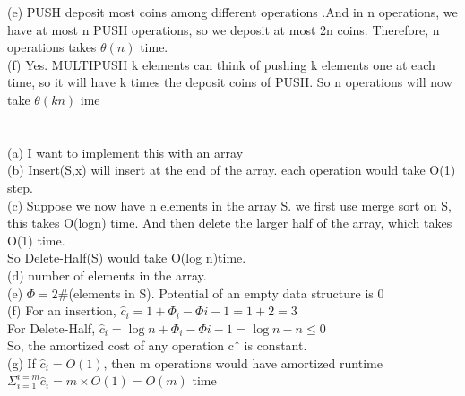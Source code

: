 \documentclass[12pt]{article}
\begin{document}
(e) PUSH deposit most coins among different operations .And in n operations, we have at most n PUSH operations, so we deposit at most 2n coins. Therefore, n operations takes $\theta(n)$ time.\\

(f) Yes. MULTIPUSH k elements can think of pushing k elements one at each time, so it will have k times the deposit coins of PUSH. So n operations will now take $\theta(kn)$ ime

\pagebreak
\section{}
(a) I want to implement this with an array\\

(b) Insert(S,x) will insert at the end of the array. each operation would take O(1) step.\\

(c) Suppose we now have n elements in the array S. we first use merge sort on S, this takes O(logn) time. And then delete the larger half of the array, which takes O(1) time.\\
So Delete-Half(S) would take O(log n)time.\\

(d) number of elements in the array.\\

(e) $\Phi = 2 \#$(elements in S). Potential of an empty data structure is 0\\

(f) For an insertion, $\hat{c}_i = 1 + \Phi_{i} - \Phi{i-1} = 1+ 2 =3$\\
For Delete-Half,   $\hat{c}_i = \log{n}  + \Phi_{i} - \Phi{i-1} = \log{n}-n \le 0$\\
So,  the amortized cost of any operation cˆ is constant.\\

(g) If $\hat{c}_i  = O(1)$, then m operations would have amortized runtime\\
$\Sigma_{i=1}^{i=m}\hat{c}_i = m \times O(1) = O(m)$ time
\end{document}
